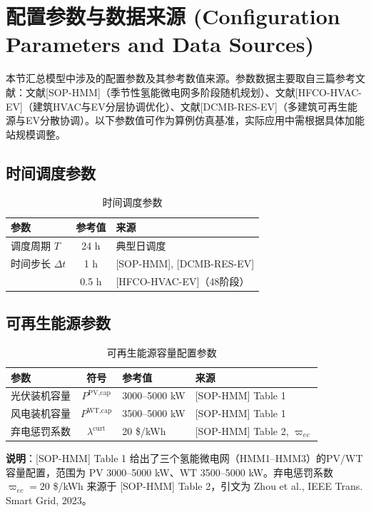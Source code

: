\documentclass[11pt]{ctexart}
\begin{document}
\section{配置参数与数据来源 (Configuration Parameters and Data Sources)}

本节汇总模型中涉及的配置参数及其参考数值来源。参数数据主要取自三篇参考文献：文献{[SOP-HMM]}（季节性氢能微电网多阶段随机规划）、文献{[HFCO-HVAC-EV]}（建筑HVAC与EV分层协调优化）、文献{[DCMB-RES-EV]}（多建筑可再生能源与EV分散协调）。以下参数值可作为算例仿真基准，实际应用中需根据具体加能站规模调整。

\subsection{时间调度参数}

\begin{table}[htbp]
\centering
\caption{时间调度参数}
\begin{tabular}{lcl}
\hline
参数 & 参考值 & 来源 \\
\hline
调度周期 $T$ & 24 h & 典型日调度 \\
时间步长 $\Delta t$ & 1 h & {[SOP-HMM]}, {[DCMB-RES-EV]} \\
& 0.5 h & {[HFCO-HVAC-EV]}（48阶段） \\
\hline
\end{tabular}
\end{table}

\subsection{可再生能源参数}

\begin{table}[htbp]
\centering
\caption{可再生能源容量配置参数}
\begin{tabular}{lcll}
\hline
参数 & 符号 & 参考值 & 来源 \\
\hline
光伏装机容量 & $P^{\text{PV,cap}}$ & 3000--5000 kW & {[SOP-HMM]} Table 1 \\
风电装机容量 & $P^{\text{WT,cap}}$ & 3500--5000 kW & {[SOP-HMM]} Table 1 \\
弃电惩罚系数 & $\lambda^{\text{curt}}$ & 20 \$/kWh & {[SOP-HMM]} Table 2, $\varpi_{ec}$ \\
\hline
\end{tabular}
\end{table}

\textbf{说明}：{[SOP-HMM]} Table 1 给出了三个氢能微电网（HMM1--HMM3）的PV/WT容量配置，范围为 PV 3000--5000 kW、WT 3500--5000 kW。弃电惩罚系数 $\varpi_{ec}=20$ \$/kWh 来源于 {[SOP-HMM]} Table 2，引文为 Zhou et al., IEEE Trans. Smart Grid, 2023。
\end{document}
